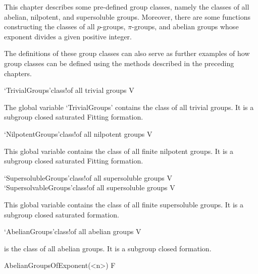 
This chapter describes some pre-defined 
group classes, namely the classes of all abelian, nilpotent, and supersoluble
groups. Moreover, there are some functions constructing the classes of all
$p$-groups, $\pi$-groups, and abelian groups whose exponent divides a given
positive integer. 

The definitions of these group classes can also serve as further examples of
how group classes can be defined using the methods described in the preceding
chapters.

\null

\>`TrivialGroups'{class}!{of all trivial groups} V

\relax
{}\relax
The global variable `TrivialGroups' contains the class of all trivial groups. It is a
subgroup closed saturated Fitting formation.

\>`NilpotentGroups'{class}!{of all nilpotent groups} V

\relax
{}\relax
This global variable contains the class of all finite nilpotent groups. It is a
subgroup closed saturated Fitting formation.


\>`SupersolubleGroups'{class}!{of all supersoluble groups} V
\>`SupersolvableGroups'{class}!{of all supersoluble groups} V

\relax
{}\relax
This global variable contains the class of all finite supersoluble groups. It
is a subgroup closed saturated formation.


\>`AbelianGroups'{class}!{of all abelian groups} V

\relax
{}\relax
{}\relax
is the class of all abelian groups. It is a subgroup closed formation.


\>AbelianGroupsOfExponent(<n>) F

